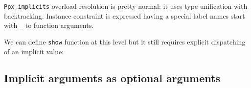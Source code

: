 \documentclass{article}
\newenvironment{Shaded}{}{}
\newcommand{\KeywordTok}[1]{\textcolor[rgb]{0.00,0.22,0.06}{\textbf{{#1}}}}
\newcommand{\DataTypeTok}[1]{\textcolor[rgb]{0.28,0.06,0.00}{{#1}}}
\newcommand{\StringTok}[1]{\textcolor[rgb]{0.12,0.22,0.30}{{#1}}}
\newcommand{\CommentTok}[1]{\textcolor[rgb]{0.19,0.30,0.30}{\textit{{#1}}}}
\newcommand{\OtherTok}[1]{\textcolor[rgb]{0.00,0.22,0.06}{{#1}}}
\newcommand{\NormalTok}[1]{{#1}}
\begin{document}
\texttt{Ppx\_implicits} overload resolution is pretty normal: 
it uses type unification with backtracking.
%
%  
%
Instance constraint is expressed having a special label names 
start with \texttt{\_} to function arguments.

We can define \texttt{show} function at this level but it still requires
explicit dispatching of an implicit value:

\begin{Shaded}
\end{Shaded}

\subsection{Implicit arguments as optional
arguments}\label{implicit-argument-using-optional-argument}
\end{document}
